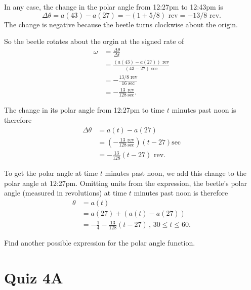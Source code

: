\documentclass{ximera}
\begin{document}
\begin{question}
\begin{explanation}
In any case, the change in the polar angle from 12:27pm to 12:43pm is
\[
  \Delta \theta = a(43) - a(27) = -(1+5/8) \text{ rev}= -13/8 \text{ rev}.
\]
The change is negative because the beetle turns clockwise about the origin.

So the beetle rotates about the orgin at the signed rate of 
\begin{align*}
  \omega &= \frac{\Delta \theta}{\Delta t} \\
               &= \frac{(a(43)-a(27))\text{ rev}}{(43 - 27) \text{ sec}} \\
              &=-\frac{13/8 \text{ rev}}{16 \text{ sec}} \\
              &= -\frac{13}{128} \frac{\text{rev}}{\text{sec}}.
\end{align*}

The change in its polar angle from 12:27pm to time $t$ minutes past noon is therefore
\begin{align*}
  \Delta \theta &= a(t) - a(27) \\
                     &=  \left( -\frac{13}{128} \frac{\text{rev}}{\text{sec}} \right) \left(t - 27  \right)\text{sec} \\
                     &=    -\frac{13}{128} \left(t-27 \right) \text{ rev}.      
\end{align*}

To get the polar angle at time $t$ minutes past noon, we add this change to the polar angle at 12:27pm. Omitting units from the expression, the beetle's polar angle (measured in revolutions) at time $t$ minutes past noon is therefore
\begin{align*}
 \theta &= a(t)  \\
          &= a(27) + (a(t) - a(27)) \\
          &= -\frac{1}{4} - \frac{13}{128} \left(t-27 \right) \, , \, 30 \leq t \leq 60.
\end{align*}
\end{explanation}

Find another possible expression for the polar angle function.
\begin{freeResponse}
\end{freeResponse}
\end{question}


\section{Quiz 4A}
\end{document}

